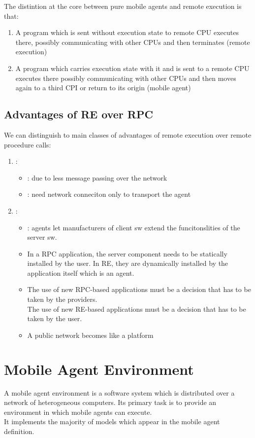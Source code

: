 The distintion at the core between pure mobile agents and remote execution is that:
\begin{enumerate}
\item A program which is sent without execution state to remote CPU executes there, possibly communicating with other CPUs and then terminates (remote execution)
\item A program which carries execution state with it and is sent to a remote CPU executes there possibly communicating with other CPUs and then moves again to a third CPI or return to its origin (mobile agent)
\end{enumerate}

\subsection{Advantages of RE over RPC}
We can distinguish to main classes of advantages of remote execution over remote procedure calls:
\begin{enumerate}
\item {}:
\begin{itemize}
\item {}: due to less message passing over the network
\item {}: need network conneciton only to transport the agent
\end{itemize}
\item {}:
\begin{itemize}
\item {}: agents let manufacturers of client sw extend the funcitonslities of the server sw.
\item In a RPC application, the server component needs to be statically installed by the user. In RE, they are dynamically installed by the application itself which is an agent.
\item The use of new RPC-based applications must be a decision that has to be taken by the providers.\\
The use of new RE-based applications must be a decision that has to be taken by the user.
\item A public network becomes like a platform
\end{itemize}
\end{enumerate}

\section{Mobile Agent Environment}
A mobile agent environment is a software system which is distributed over a network of heterogeneous computers. Its primary task is to provide an environment in which mobile agents can execute.\\
It implements the majority of models which appear in the mobile agent definition.

